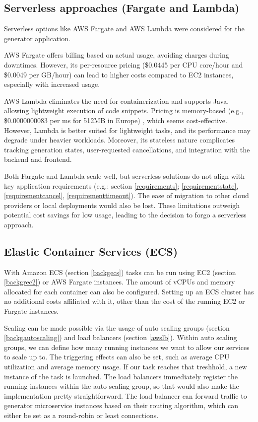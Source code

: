 	\subsection{Serverless approaches (Fargate and Lambda)} \label{consserverless}
		Serverless options like AWS Fargate and AWS Lambda were considered for the generator application. 

		AWS Fargate offers billing based on actual usage, avoiding charges during downtimes. However, 
		its per-resource pricing (\$0.0445 per CPU core/hour and \$0.0049 per GB/hour) \cite{fargateprice} 
		can lead to higher costs compared to 
		EC2 instances, especially with increased usage.

		AWS Lambda eliminates the need for containerization and supports Java, allowing lightweight execution of code snippets. 
		Pricing is memory-based (e.g., \$0.0000000083 per ms for 512MB in Europe) \cite{lambdaprice}, which seems cost-effective. 
		However, Lambda is better suited for lightweight tasks, and its performance may degrade under heavier workloads. 
		Moreover, its stateless nature complicates tracking generation states, user-requested cancellations, and 
		integration with the backend and frontend.

		Both Fargate and Lambda scale well, but serverless solutions do not align with key application requirements
		(e.g.: section \ref{requirements}; \ref{requirementstate}, \ref{requirementcancel}, \ref{requirementtimeout}).
		The ease of migration to other cloud providers or local deployments would also be lost. 
		These limitations outweigh potential cost savings for low usage, leading to the decision to forgo a serverless approach.
		

	\subsection{Elastic Container Services (ECS)}
		With Amazon ECS (section \ref{backgecs}) tasks can be run using EC2 (section \ref{backgrec2}) or AWS Fargate instances.
		The amount of vCPUs and memory allocated for each container can also be configured.
		Setting up an ECS cluster has no additional costs affiliated with it, other than the cost of the running EC2 or Fargate instances.

		Scaling can be made possible via the usage of auto scaling groups (section \ref{backgautoscaling}) and load balancers 
		(section \ref{awslb}). Within auto scaling groups, we can define how many
		running instances we want to allow our services to scale up to. The triggering effects can also be set, such as average CPU utilization and 
		average memory usage. If our task reaches that treshhold, a new instance of the task is launched.  
		The load balancers immediately register the running instances within the auto
		scaling group, so that would also make the implementation pretty straightforward. The load balancer can forward traffic to generator 
		microservice instances based on their routing algorithm, which can either be set as a round-robin or least connections.


